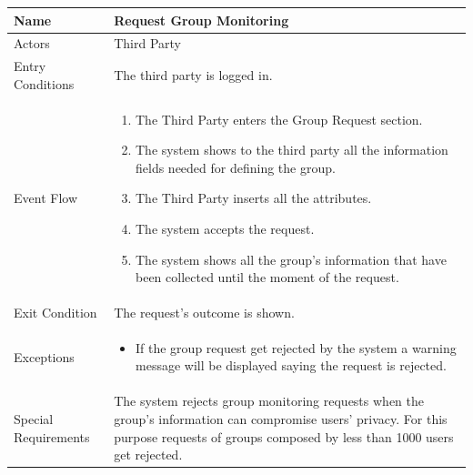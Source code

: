 \begin{enumerate}
\FloatBarrier
\begin{table}[h]
\begin{tabular}{|l|p{}|}
\hline
Name             & Request Group Monitoring \\ \hline
Actors           & Third Party  \\ \hline
Entry Conditions & The third party is logged in.    \\ \hline
Event Flow       & \begin{enumerate}
            \item The Third Party enters the Group Request section.
            \item The system shows to the third party all the information fields needed for defining the group.
            \item The Third Party inserts all the attributes.
            \item The system accepts the request.
            \item The system shows all the group's information that have been collected until the moment of the request. 
        \end{enumerate}\\ \hline
Exit Condition   & The request's outcome is shown.\\ \hline
Exceptions       & \begin{itemize}
\item If the group request get rejected by the system a warning message will be displayed saying the request is rejected.
\end{itemize}\\ \hline
Special Requirements & The system rejects group monitoring requests when the group's information can compromise users' privacy. For this purpose requests of groups composed by less than 1000 users get rejected.
\\ \hline
\end{tabular}
\end{table}
\FloatBarrier


\end{enumerate}
